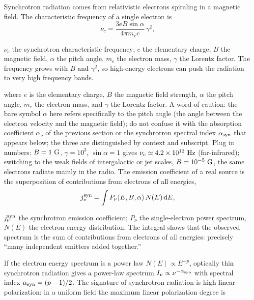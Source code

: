 Synchrotron radiation comes from relativistic electrons spiraling in a magnetic field. The characteristic frequency of a single electron is
\begin{equation}
  \nu_c=\frac{3eB\sin\alpha}{4\pi m_ec}\,\gamma^2 ,
  \label{eq:e16-synch-critical}
\end{equation}
\begin{formulaexplain}
\(\nu_c\) the synchrotron characteristic frequency; \(e\) the elementary charge, \(B\) the magnetic field, \(\alpha\) the pitch angle, \(m_e\) the electron mass, \(\gamma\) the Lorentz factor. The frequency grows with \(B\) and \(\gamma^2\), so high-energy electrons can push the radiation to very high frequency bands.
\end{formulaexplain}
where \(e\) is the elementary charge, \(B\) the magnetic field strength, \(\alpha\) the pitch angle, \(m_e\) the electron mass, and \(\gamma\) the Lorentz factor. A word of caution: the bare symbol \(\alpha\) here refers specifically to the pitch angle (the angle between the electron velocity and the magnetic field); do not confuse it with the absorption coefficient \(\alpha_\nu\) of the previous section or the synchrotron spectral index \(\alpha_{\rm syn}\) that appears below; the three are distinguished by context and subscript. Plug in numbers: \(B=1~{\rm G}\), \(\gamma=10^3\), \(\sin\alpha=1\) gives \(\nu_c\simeq4.2\times10^{12}~{\rm Hz}\) (far-infrared); switching to the weak fields of intergalactic or jet scales, \(B=10^{-5}~{\rm G}\), the same electrons radiate mainly in the radio. The emission coefficient of a real source is the superposition of contributions from electrons of all energies,
\begin{equation}
  j_\nu^{\rm syn}=\int P_\nu(E,B,\alpha)\,N(E)\,{\rm d}E ,
  \label{eq:e16-synch-emissivity}
\end{equation}
\begin{formulaexplain}
\(j_\nu^{\rm syn}\) the synchrotron emission coefficient; \(P_\nu\) the single-electron power spectrum, \(N(E)\) the electron energy distribution. The integral shows that the observed spectrum is the sum of contributions from electrons of all energies: precisely ``many independent emitters added together.''
\end{formulaexplain}
If the electron energy spectrum is a power law \(N(E)\propto E^{-p}\), optically thin synchrotron radiation gives a power-law spectrum \(I_\nu\propto\nu^{-\alpha_{\rm syn}}\) with spectral index \(\alpha_{\rm syn}=(p-1)/2\). The signature of synchrotron radiation is high linear polarization: in a uniform field the maximum linear polarization degree is
